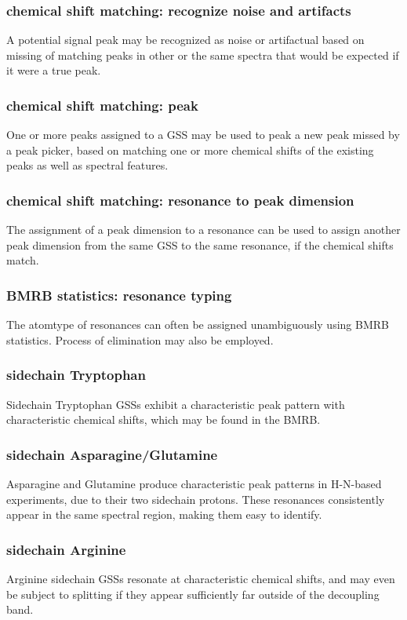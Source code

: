 \subsubsection{chemical shift matching: recognize noise and artifacts}
A potential signal peak may be recognized as noise or artifactual based on
missing of matching peaks in other or the same spectra that would be expected
if it were a true peak.

\subsubsection{chemical shift matching: peak}
One or more peaks assigned to a GSS may be used to peak a new peak missed by a
peak picker, based on matching one or more chemical shifts of the existing peaks
as well as spectral features.

\subsubsection{chemical shift matching: resonance to peak dimension}
The assignment of a peak dimension to a resonance can be used to assign another
peak dimension from the same GSS to the same resonance, if the chemical shifts
match.

\subsubsection{BMRB statistics: resonance typing}
The atomtype of resonances can often be assigned unambiguously using BMRB
statistics.  Process of elimination may also be employed.

\subsubsection{sidechain Tryptophan}
Sidechain Tryptophan GSSs exhibit a characteristic peak pattern with 
characteristic chemical shifts, which may be found in the BMRB.

\subsubsection{sidechain Asparagine/Glutamine}
Asparagine and Glutamine produce characteristic peak patterns in H-N-based 
experiments, due to their two sidechain protons.  These resonances consistently
appear in the same spectral region, making them easy to identify.

\subsubsection{sidechain Arginine}
Arginine sidechain GSSs resonate at characteristic chemical shifts, and may
even be subject to splitting if they appear sufficiently far outside of the
decoupling band.


